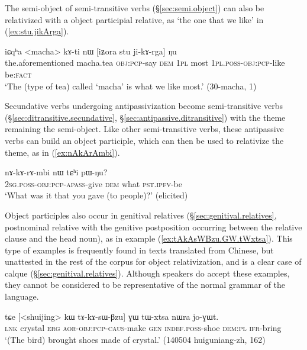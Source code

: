 The semi-object of semi-transitive verbs (§\ref{sec:semi.object}) can also be relativized with a object participial relative, as  `the one that we like' in (\ref{ex:stu.jikArga}).

\begin{exe}
\ex \label{ex:stu.jikArga}
\gll  iɕqʰa <macha> kɤ-ti nɯ [iʑora stu ji-kɤ-rga] ŋu \\
the.aforementioned macha.tea \textsc{obj}:\textsc{pcp}-say \textsc{dem} \textsc{1pl} most \textsc{1pl}.\textsc{poss}-\textsc{obj}:\textsc{pcp}-like be:\textsc{fact} \\
\glt `The (type of tea) called `macha' is what we like most.' (30-macha, 1)
\end{exe}

Secundative verbs undergoing antipassivization become semi-transitive verbs (§\ref{sec:ditransitive.secundative}, §\ref{sec:antipassive.ditransitive}) with the theme remaining the semi-object. Like other semi-transitive verbs, these antipassive verbs can build an object participle, which can then be used to relativize the theme, as in (\ref{ex:nAkArAmbi}).

\begin{exe}
\ex \label{ex:nAkArAmbi}
\gll  nɤ-kɤ-rɤ-mbi nɯ tɕʰi pɯ-ŋu? \\
\textsc{2sg}.\textsc{poss}-\textsc{obj}:\textsc{pcp}-\textsc{apass}-give \textsc{dem} what \textsc{pst}.\textsc{ipfv}-be \\
\glt `What was it that you gave (to people)?' (elicited)
\end{exe}

Object participles also occur in genitival relatives (§\ref{sec:genitival.relatives}, postnominal relative with the genitive postposition  occurring between the relative clause and the head noun), as in example (\ref{ex:tAkAsWBzu.GW.tWxtsa}). This type of examples is frequently found in texts translated from Chinese, but unattested in the rest of the corpus for object relativization, and is a clear case of calque (§\ref{sec:genitival.relatives}). Although speakers do accept these examples, they cannot be considered to be representative of the normal grammar of the language.

\begin{exe}
\ex \label{ex:tAkAsWBzu.GW.tWxtsa}
\gll  tɕe [<shuijing> kɯ tɤ-kɤ-sɯ-βzu] ɣɯ tɯ-xtsa nɯra jo-ɣɯt. \\
\textsc{lnk} crystal \textsc{erg} \textsc{aor}-\textsc{obj}:\textsc{pcp}-\textsc{caus}-make \textsc{gen} \textsc{indef}.\textsc{poss}-shoe \textsc{dem}:\textsc{pl} \textsc{ifr}-bring \\
\glt `(The bird) brought shoes made of crystal.' (140504 huiguniang-zh, 162)
\end{exe}

